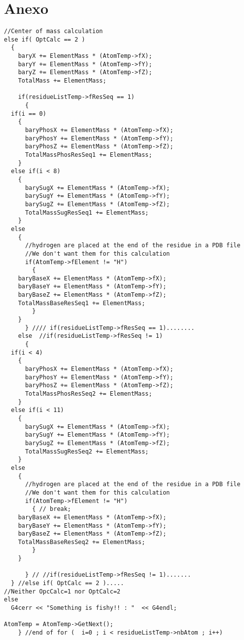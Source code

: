 \section{Anexo}
\label{app:B}
\lstset {language=C++}
\begin{lstlisting}
//Center of mass calculation
else if( OptCalc == 2 )
  {
    baryX += ElementMass * (AtomTemp->fX);
    baryY += ElementMass * (AtomTemp->fY);
    baryZ += ElementMass * (AtomTemp->fZ);
    TotalMass += ElementMass;

    if(residueListTemp->fResSeq == 1)
      {
  if(i == 0)
    {
      baryPhosX += ElementMass * (AtomTemp->fX);
      baryPhosY += ElementMass * (AtomTemp->fY);
      baryPhosZ += ElementMass * (AtomTemp->fZ);
      TotalMassPhosResSeq1 += ElementMass;
    }
  else if(i < 8)
    {
      barySugX += ElementMass * (AtomTemp->fX);
      barySugY += ElementMass * (AtomTemp->fY);
      barySugZ += ElementMass * (AtomTemp->fZ);
      TotalMassSugResSeq1 += ElementMass;
    }
  else
    {
      //hydrogen are placed at the end of the residue in a PDB file
      //We don't want them for this calculation
      if(AtomTemp->fElement != "H")
        {
    baryBaseX += ElementMass * (AtomTemp->fX);
    baryBaseY += ElementMass * (AtomTemp->fY);
    baryBaseZ += ElementMass * (AtomTemp->fZ);
    TotalMassBaseResSeq1 += ElementMass;
        }
    }
      } //// if(residueListTemp->fResSeq == 1)........
    else  //if(residueListTemp->fResSeq != 1)
      {
  if(i < 4)
    {
      baryPhosX += ElementMass * (AtomTemp->fX);
      baryPhosY += ElementMass * (AtomTemp->fY);
      baryPhosZ += ElementMass * (AtomTemp->fZ);
      TotalMassPhosResSeq2 += ElementMass;
    }
  else if(i < 11)
    {
      barySugX += ElementMass * (AtomTemp->fX);
      barySugY += ElementMass * (AtomTemp->fY);
      barySugZ += ElementMass * (AtomTemp->fZ);
      TotalMassSugResSeq2 += ElementMass;
    }
  else
    {
      //hydrogen are placed at the end of the residue in a PDB file
      //We don't want them for this calculation
      if(AtomTemp->fElement != "H")
        { // break;
    baryBaseX += ElementMass * (AtomTemp->fX);
    baryBaseY += ElementMass * (AtomTemp->fY);
    baryBaseZ += ElementMass * (AtomTemp->fZ);
    TotalMassBaseResSeq2 += ElementMass;
        }
    }

      } // //if(residueListTemp->fResSeq != 1).......
  } //else if( OptCalc == 2 ).....
//Neither OpcCalc=1 nor OptCalc=2
else
  G4cerr << "Something is fishy!! : "  << G4endl;

AtomTemp = AtomTemp->GetNext();
    } //end of for (  i=0 ; i < residueListTemp->nbAtom ; i++)

\end{lstlisting}
